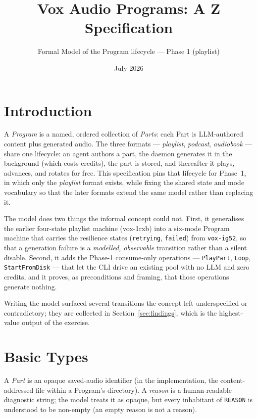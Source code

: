 \documentclass[a4paper,10pt,fleqn]{article}
\begin{document}
\title{Vox Audio Programs: A Z Specification}
\author{Formal Model of the Program lifecycle --- Phase 1 (playlist)}
\date{July 2026}
\maketitle

\tableofcontents
\newpage

\section{Introduction}

A \emph{Program} is a named, ordered collection of \emph{Parts}: each Part is
LLM-authored content plus generated audio. The three formats --- \emph{playlist},
\emph{podcast}, \emph{audiobook} --- share one lifecycle: an agent authors a
part, the daemon generates it in the background (which costs credits), the part
is stored, and thereafter it plays, advances, and rotates for free. This
specification pins that lifecycle for Phase~1, in which only the \emph{playlist}
format exists, while fixing the shared state and mode vocabulary so that the
later formats extend the same model rather than replacing it.

The model does two things the informal concept could not. First, it
generalises the earlier four-state playlist machine (vox-1rxb)
into a six-mode Program machine that carries the resilience states
(\texttt{retrying}, \texttt{failed}) from \texttt{vox-ig52}, so that a
generation failure is a \emph{modelled, observable} transition rather than a
silent disable. Second, it adds the Phase-1 consume-only operations ---
\texttt{PlayPart}, \texttt{Loop}, \texttt{StartFromDisk} --- that let the CLI
drive an existing pool with no LLM and zero credits, and it proves, as
preconditions and framing, that those operations generate nothing.

Writing the model surfaced several transitions the concept left underspecified
or contradictory; they are collected in Section~\ref{sec:findings}, which is
the highest-value output of the exercise.

\section{Basic Types}

A \emph{Part} is an opaque saved-audio identifier (in the implementation, the
content-addressed file within a Program's directory). A \emph{reason} is a
human-readable diagnostic string; the model treats it as opaque, but every
inhabitant of \texttt{REASON} is understood to be non-empty (an empty reason is
not a reason).
\end{document}

